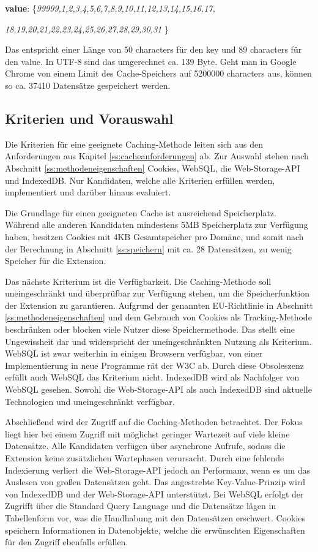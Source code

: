 \textbf{value}: \big\{\textit{99999,1,2,3,4,5,6,7,8,9,10,11,12,13,14,15,16,17,}
	
\textit{18,19,20,21,22,23,24,25,26,27,28,29,30,31} \big\}

Das entspricht einer Länge von 50 characters für den key und 89 characters für den value. In UTF-8 sind das umgerechnet ca. 139 Byte. Geht man in Google Chrome von einem Limit des Cache-Speichers auf 5200000 characters\cite{test} aus, können so ca. 37410 Datensätze gespeichert werden.

\subsection{Kriterien und Vorauswahl}
\label{vorauswahl}

Die Kriterien für eine geeignete Caching-Methode leiten sich aus den Anforderungen aus Kapitel \ref{ss:cacheanforderungen} ab. Zur Auswahl stehen nach Abschnitt \ref{ss:methodeneigenschaften} Cookies, WebSQL, die Web-Storage-API und IndexedDB. Nur Kandidaten, welche alle Kriterien erfüllen werden, implementiert und darüber hinaus evaluiert.

Die Grundlage für einen geeigneten Cache ist ausreichend Speicherplatz. Während alle anderen Kandidaten mindestens 5MB Speicherplatz zur Verfügung haben, besitzen Cookies mit 4KB Gesamtspeicher pro Domäne, und somit nach der Berechnung in Abschnitt \ref{ss:speichern} mit ca. 28 Datensätzen, zu wenig Speicher für die Extension. 

Das nächste Kriterium ist die Verfügbarkeit. Die Caching-Methode soll uneingeschränkt und überprüfbar zur Verfügung stehen, um die Speicherfunktion der Extension zu garantieren. Aufgrund der genannten EU-Richtlinie in Abschnitt \ref{ss:methodeneigenschaften} und dem Gebrauch von Cookies als Tracking-Methode beschränken oder blocken viele Nutzer diese Speichermethode. Das stellt eine Ungewissheit dar und widerspricht der uneingeschränkten Nutzung als Kriterium.
WebSQL ist zwar weiterhin in einigen Browsern verfügbar, von einer Implementierung in neue Programme rät der W3C ab\cite{websql}. Durch diese Obsoleszenz erfüllt auch WebSQL das Kriterium nicht. IndexedDB wird als Nachfolger von WebSQL gesehen. Sowohl die Web-Storage-API als auch IndexedDB sind aktuelle Technologien und uneingeschränkt verfügbar.

Abschließend wird der Zugriff auf die Caching-Methoden betrachtet. Der Fokus liegt hier bei einem Zugriff mit möglichst geringer Wartezeit auf viele kleine Datensätze. Alle Kandidaten verfügen über asynchrone Aufrufe, sodass die Extension keine zusätzlichen Wartephasen verursacht. Durch eine fehlende Indexierung verliert die Web-Storage-API jedoch an Performanz, wenn es um das Auslesen von großen Datensätzen geht. Das angestrebte Key-Value-Prinzip wird von IndexedDB und der Web-Storage-API unterstützt. Bei WebSQL erfolgt der Zugrifft über die \glqq Standard Query Language \grqq{} und die Datensätze lägen in Tabellenform vor, was die Handhabung mit den Datensätzen erschwert. Cookies speichern Informationen in Datenobjekte, welche die erwünschten Eigenschaften für den Zugriff ebenfalls erfüllen.

